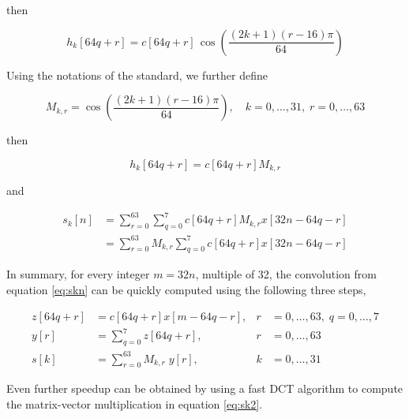 \documentclass{article} %
\begin{document}
then

\begin{equation}
\label{eq:hk}
h_k[64q+r]=c[64q+r] \, \cos \left( \frac{(2k+1)(r-16)\pi}{64}\right)
\end{equation}

Using the notations of the standard, we further define


\begin{equation}
\label{eq:mkr}
\boxed{
M_{k,r}=\cos \left( \frac{(2k+1)(r-16)\pi}{64}\right), 
\quad k=0,\dots,31, \; r=0,\dots,63
}
\end{equation}

then

\begin{equation}
h_k[64q+r]=c[64q+r]M_{k,r}
\end{equation}

and


\begin{align}
s_k[n]&=\sum\limits_{r=0}^{63} \sum\limits_{q=0}^{7} 
c[64q+r] M_{k,r} x[32n-64q-r]\\ 
& =  \sum\limits_{r=0}^{63} M_{k,r} \sum\limits_{q=0}^{7} 
c[64q+r] x[32n-64q-r]
\end{align}


In summary, for every integer $m=32n$, multiple of 32, the convolution from
equation \ref{eq:skn} can be quickly computed using the following three steps,

\begin{align}
z[64q+r] &= c[64q+r]x[m-64q-r], &r&=0,\dots,63, \; q=0,\dots,7
\label{eq:zqr}\\
y[r]	 &= \sum \limits _{q=0}^{7} z[64q+r], &r&=0,\dots,63 
\label{eq:yr}\\
s[k]	 &= \sum \limits _{r=0} ^{63} M_{k,r}\; y[r],  &k&=0,\dots,31
 \label{eq:sk2}
\end{align}

Even further speedup can be obtained by using a fast DCT algorithm to compute
the matrix-vector multiplication in equation \ref{eq:sk2}.

\end{document}
